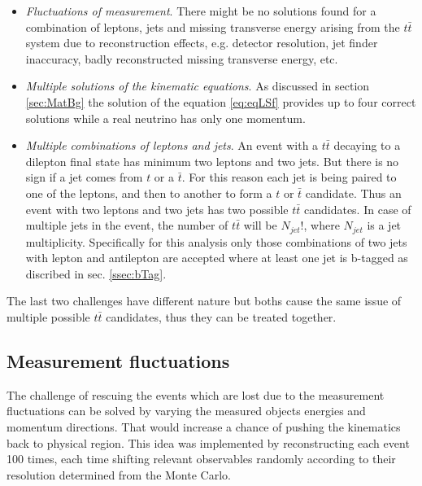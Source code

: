 \begin{itemize}
 \item \textit{Fluctuations of measurement}. There might be no solutions found for a combination
 of leptons, jets and missing transverse energy arising from the $t\bar{t}$ system due to reconstruction effects, e.g. detector resolution,
 jet finder inaccuracy, badly reconstructed missing transverse energy, etc.
 \item \textit{Multiple solutions of the kinematic equations}. As discussed in section \ref{sec:MatBg} the solution of the equation \ref{eq:eqLSf}
 provides up to four correct solutions while a real neutrino has only one momentum.
 \item \textit{Multiple combinations of leptons and jets}. An event with a $t\bar{t}$ decaying to a dilepton final state has minimum two leptons and two
 jets. But there is no sign if a jet comes from $t$ or a $\bar{t}$. For this reason each jet is being paired to one of the leptons, and then to another
 to form a $t$ or $\bar{t}$ candidate. Thus an event with two leptons and two jets has two possible $t\bar{t}$ candidates. In case of multiple jets
 in the event, the number of $t\bar{t}$ will be $N_{jet}!$, where $N_{jet}$ is a jet multiplicity. Specifically for this analysis only those combinations 
 of two jets with lepton and antilepton are accepted where at least one jet is b-tagged as discribed in sec. \ref{ssec:bTag}.
\end{itemize}

The last two challenges have different nature but boths cause the same issue of multiple possible $t\bar{t}$ candidates, thus they can be treated together.

\subsection{Measurement fluctuations}

The challenge of rescuing the events which are lost due to the measurement fluctuations can be solved by varying the measured objects energies and
momentum directions. That would increase a chance of pushing the kinematics back to physical region. This idea was implemented by reconstructing
each event 100 times, each time shifting relevant observables randomly according to their resolution determined from the Monte Carlo.

